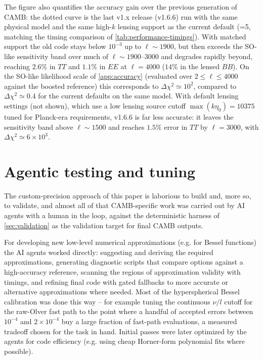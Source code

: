 \documentclass[prd, twocolumn, superscriptaddress, tightenlines, longbibliography, nofootinbib, eqsecnum, amsfonts, amsmath, floatfix, notitlepage]{revtex4-2}
\newcommand{\code}[1]{\texttt{\detokenize{#1}}}
\begin{document}
The figure also quantifies the accuracy gain over the previous generation of
\textsc{CAMB}: the dotted curve is the last v1.x release (v1.6.6) run with the
same physical model and the same high-$k$ lensing support as the current
default (\code{lens_potential_accuracy}=5, matching the timing comparison of
\cref{tab:performance-timings}). With matched support the old code stays below
$10^{-3}$ up to $\ell\sim1900$, but then exceeds the SO-like sensitivity band
over much of $\ell\sim1900$--$3000$ and degrades rapidly beyond, reaching
$2.6\%$ in $TT$ and $1.1\%$ in $EE$ at $\ell=4000$ ($14\%$ in the lensed
$BB$). On the SO-like likelihood scale of \cref{app:accuracy} (evaluated over
$2\le\ell\le4000$ against the boosted reference) this corresponds to
$\Delta\chi^2\simeq10^2$, compared to $\Delta\chi^2\simeq0.4$ for the current
defaults on the same model. With default lensing settings (not shown), which
use a low lensing source cutoff $\max(k\eta_0)=10375$ tuned for
Planck-era requirements, v1.6.6 is far less accurate: it leaves the
sensitivity band above $\ell\sim1500$ and reaches $1.5\%$ error in $TT$ by
$\ell=3000$, with $\Delta\chi^2\simeq6\times10^3$.



\section{Agentic testing and tuning}
\label{sec:agentic}

The custom-precision approach of this paper is laborious to build and, more so, to
validate, and almost all of that CAMB-specific work was carried out by AI agents with a human in
the loop, against the deterministic \code{check_accuracy} harness of
\cref{sec:validation} as the validation target for final \textsc{CAMB} outputs.

For developing new low-level numerical approximations (e.g. for Bessel functions) the AI agents worked
directly: suggesting and deriving the required approximations, generating diagnostic scripts that compare options against a high-accuracy reference, scanning the regions of approximation validity with timings, and refining final code with gated fallbacks to more accurate or alternative approximations where needed. Most of the hyperspherical Bessel calibration was done this way -- for example tuning the continuous \(\nu/l\) cutoff for the raw-Olver fast path to the
point where a handful of accepted errors between \(10^{-4}\) and \(2\times10^{-4}\)
buy a large fraction of fast-path evaluations, a measured tradeoff chosen for the task in hand. Initial passes were later optimized by the agents for code efficiency (e.g. using cheap Horner-form polynomial fits where possible).
\end{document}
